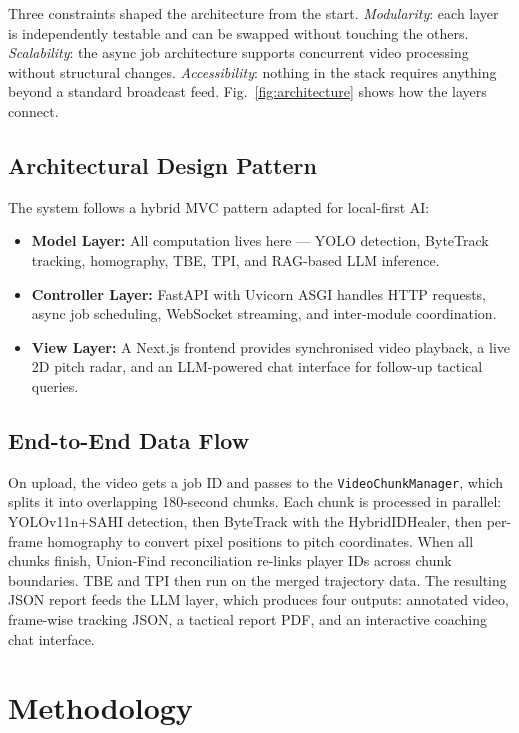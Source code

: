 \documentclass[conference]{IEEEtran}
\begin{document}
Three constraints shaped the architecture from the start. \textit{Modularity}: each layer is independently testable and can be swapped without touching the others. \textit{Scalability}: the async job architecture supports concurrent video processing without structural changes. \textit{Accessibility}: nothing in the stack requires anything beyond a standard broadcast feed. Fig.~\ref{fig:architecture} shows how the layers connect.

\subsection{Architectural Design Pattern}

The system follows a hybrid MVC pattern adapted for local-first AI:

\begin{itemize}
    \item \textbf{Model Layer:} All computation lives here --- YOLO detection, ByteTrack tracking, homography, TBE, TPI, and RAG-based LLM inference.
    \item \textbf{Controller Layer:} FastAPI with Uvicorn ASGI handles HTTP requests, async job scheduling, WebSocket streaming, and inter-module coordination.
    \item \textbf{View Layer:} A Next.js frontend provides synchronised video playback, a live 2D pitch radar, and an LLM-powered chat interface for follow-up tactical queries.
\end{itemize}

\subsection{End-to-End Data Flow}

On upload, the video gets a job ID and passes to the \texttt{VideoChunkManager}, which splits it into overlapping 180-second chunks. Each chunk is processed in parallel: YOLOv11n+SAHI detection, then ByteTrack with the HybridIDHealer, then per-frame homography to convert pixel positions to pitch coordinates. When all chunks finish, Union-Find reconciliation re-links player IDs across chunk boundaries. TBE and TPI then run on the merged trajectory data. The resulting JSON report feeds the LLM layer, which produces four outputs: annotated video, frame-wise tracking JSON, a tactical report PDF, and an interactive coaching chat interface.

\section{Methodology}
\label{sec:methodology}
\end{document}

